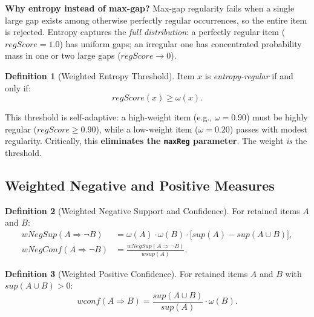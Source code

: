 \documentclass[10pt,twocolumn]{article}
\theoremstyle{plain}
\theoremstyle{definition}
\newtheorem{definition}{Definition}[section]
\theoremstyle{remark}
\newcommand{\wsup}{\mathit{wsup}}
\newcommand{\wconf}{\mathit{wconf}}
\newcommand{\wNegSup}{\mathit{wNegSup}}
\newcommand{\wNegConf}{\mathit{wNegConf}}
\newcommand{\regscore}{\mathit{regScore}}
\begin{document}
\begin{tcolorbox}[notebox]
\textbf{Why entropy instead of max-gap?}
Max-gap regularity fails when a single large gap exists among
otherwise perfectly regular occurrences, so the entire item is
rejected.
Entropy captures the \emph{full distribution}: a perfectly regular
item ($\regscore = 1.0$) has uniform gaps;
an irregular one has concentrated probability mass in one or two
large gaps ($\regscore \to 0$).
\end{tcolorbox}

\begin{definition}[Weighted Entropy Threshold]
\label{def:entropy_threshold}
Item $x$ is \emph{entropy-regular} if and only if:
\begin{equation}
  \regscore(x) \geq \omega(x).
  \label{eq:threshold}
\end{equation}
\end{definition}

This threshold is self-adaptive: a high-weight item (e.g.,
$\omega = 0.90$) must be highly regular ($\regscore \geq 0.90$),
while a low-weight item ($\omega = 0.20$) passes with modest
regularity.
Critically, this \textbf{eliminates the \texttt{maxReg} parameter}. The weight \emph{is} the threshold.

\subsection{Weighted Negative and Positive Measures}

\begin{definition}[Weighted Negative Support and Confidence]
\label{def:wnegsup}
For retained items $A$ and $B$:
\begin{align}
  \wNegSup(A \!\Rightarrow\! \lnot B)
    &= \omega(A) \cdot \omega(B) \cdot
       \bigl[\mathit{sup}(A) - \mathit{sup}(A \cup B)\bigr],
    \label{eq:wnegsup} \\
  \wNegConf(A \!\Rightarrow\! \lnot B)
    &= \frac{\wNegSup(A \!\Rightarrow\! \lnot B)}{\wsup(A)}.
    \label{eq:wnegconf}
\end{align}
\end{definition}

\begin{definition}[Weighted Positive Confidence]
\label{def:wposconf}
For retained items $A$ and $B$ with $\mathit{sup}(A \cup B) > 0$:
\begin{equation}
  \wconf(A \!\Rightarrow\! B)
    = \frac{\mathit{sup}(A \cup B)}{\mathit{sup}(A)} \cdot \omega(B).
  \label{eq:wposconf}
\end{equation}
\end{definition}
\end{document}
